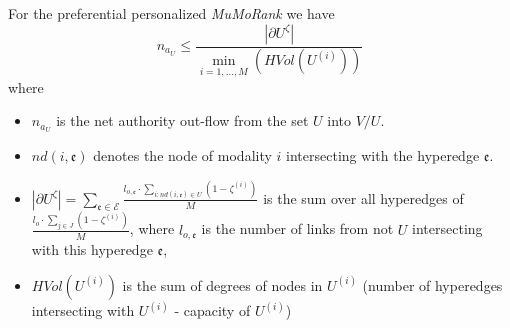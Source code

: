 \documentclass{fundam}
\newcommand{\HEM}{\mathcal{E}}
\newcommand{\hem}{\mathfrak{e}}
\newcommand{\N}{ V }
\begin{document}
\begin{theorem} \label{thMPRlimituneqzeta}
For the preferential personalized \emph{MuMoRank}
we have
$$ n_{a_U}
\le  \frac{|\partial{U^\zeta}| }{\min_{i=1,...,M}(HVol(U^{(i)}))}$$
\eject
where
\begin{itemize}
\itemsep=0.95pt
\item $n_{a_U}$ is the net authority out-flow from the  set $U$ into $\N / U$.
\item  $nd(i,\hem)$ denotes the node of modality $i$ intersecting with the hyperedge $\hem$.
\item $|\partial {U^\zeta} |
=\sum_{\hem\in\HEM}
\frac{l_{o,\hem} \cdot  \sum_{i: nd(i,\hem)\in U} (1-\zeta^{(i)})}{M}
$ is the
sum over all hyperedges of $\frac{l_o \cdot  \sum_{j\in J} (1-\zeta^{(i)})}{M}$,
where
 $l_{o,\hem}$ is the number of links from not $U$ intersecting with this hyperedge $\hem$,
\item  $HVol(U^{(i)})$ is the sum of  degrees of nodes in  $U^{(i)}$ (number of   hyperedges intersecting with  $U^{(i)}$ -  capacity of $U^{(i)}$)\QED
\end{itemize}
\end{theorem}
\end{document}
